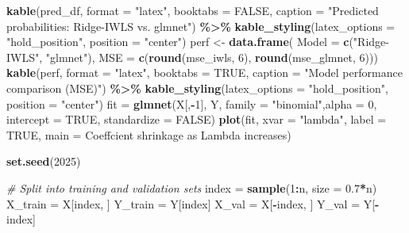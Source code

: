 \documentclass[12pt,halfline,a4paper,]{ouparticle}
\newenvironment{Shaded}{\begin{snugshade}}{\end{snugshade}}
\newcommand{\AttributeTok}[1]{\textcolor[rgb]{0.13,0.29,0.53}{#1}}
\newcommand{\CommentTok}[1]{\textcolor[rgb]{0.56,0.35,0.01}{\textit{#1}}}
\newcommand{\ConstantTok}[1]{\textcolor[rgb]{0.56,0.35,0.01}{#1}}
\newcommand{\DecValTok}[1]{\textcolor[rgb]{0.00,0.00,0.81}{#1}}
\newcommand{\FloatTok}[1]{\textcolor[rgb]{0.00,0.00,0.81}{#1}}
\newcommand{\FunctionTok}[1]{\textcolor[rgb]{0.13,0.29,0.53}{\textbf{#1}}}
\newcommand{\NormalTok}[1]{#1}
\newcommand{\OtherTok}[1]{\textcolor[rgb]{0.56,0.35,0.01}{#1}}
\newcommand{\SpecialCharTok}[1]{\textcolor[rgb]{0.81,0.36,0.00}{\textbf{#1}}}
\newcommand{\StringTok}[1]{\textcolor[rgb]{0.31,0.60,0.02}{#1}}
\begin{document}
\begin{Shaded}
\begin{Highlighting}[]
\FunctionTok{kable}\NormalTok{(pred\_df, }\AttributeTok{format =} \StringTok{"latex"}\NormalTok{, }\AttributeTok{booktabs =} \ConstantTok{FALSE}\NormalTok{, }\AttributeTok{caption =} \StringTok{"Predicted probabilities: Ridge{-}IWLS vs. glmnet"}\NormalTok{) }\SpecialCharTok{\%\textgreater{}\%}
  \FunctionTok{kable\_styling}\NormalTok{(}\AttributeTok{latex\_options =} \StringTok{"hold\_position"}\NormalTok{, }\AttributeTok{position =} \StringTok{"center"}\NormalTok{)}
\NormalTok{perf }\OtherTok{\textless{}{-}} \FunctionTok{data.frame}\NormalTok{(}
  \AttributeTok{Model =} \FunctionTok{c}\NormalTok{(}\StringTok{"Ridge{-}IWLS"}\NormalTok{, }\StringTok{"glmnet"}\NormalTok{),}
  \AttributeTok{MSE =} \FunctionTok{c}\NormalTok{(}\FunctionTok{round}\NormalTok{(mse\_iwls, }\DecValTok{6}\NormalTok{), }\FunctionTok{round}\NormalTok{(mse\_glmnet, }\DecValTok{6}\NormalTok{)))}
  \FunctionTok{kable}\NormalTok{(perf, }\AttributeTok{format =} \StringTok{"latex"}\NormalTok{, }\AttributeTok{booktabs =} \ConstantTok{TRUE}\NormalTok{, }\AttributeTok{caption =} \StringTok{"Model performance comparison (MSE)"}\NormalTok{) }\SpecialCharTok{\%\textgreater{}\%}
  \FunctionTok{kable\_styling}\NormalTok{(}\AttributeTok{latex\_options =} \StringTok{"hold\_position"}\NormalTok{, }\AttributeTok{position =} \StringTok{"center"}\NormalTok{)}
\NormalTok{fit }\OtherTok{=} \FunctionTok{glmnet}\NormalTok{(X[,}\SpecialCharTok{{-}}\DecValTok{1}\NormalTok{], Y, }\AttributeTok{family =} \StringTok{"binomial"}\NormalTok{,}\AttributeTok{alpha =} \DecValTok{0}\NormalTok{, }\AttributeTok{intercept =} \ConstantTok{TRUE}\NormalTok{, }\AttributeTok{standardize =} \ConstantTok{FALSE}\NormalTok{)}
\FunctionTok{plot}\NormalTok{(fit, }\AttributeTok{xvar =} \StringTok{"lambda"}\NormalTok{, }\AttributeTok{label =} \ConstantTok{TRUE}\NormalTok{, }\AttributeTok{main =} \StringTok{\textquotesingle{}Coeffcient shrinkage as Lambda increases\textquotesingle{}}\NormalTok{)}

\FunctionTok{set.seed}\NormalTok{(}\DecValTok{2025}\NormalTok{)}

\CommentTok{\# Split into training and validation sets}
\NormalTok{index }\OtherTok{=} \FunctionTok{sample}\NormalTok{(}\DecValTok{1}\SpecialCharTok{:}\NormalTok{n, }\AttributeTok{size =} \FloatTok{0.7}\SpecialCharTok{*}\NormalTok{n)}
\NormalTok{X\_train }\OtherTok{=}\NormalTok{ X[index, ]}
\NormalTok{Y\_train }\OtherTok{=}\NormalTok{ Y[index]}
\NormalTok{X\_val }\OtherTok{=}\NormalTok{ X[}\SpecialCharTok{{-}}\NormalTok{index, ]}
\NormalTok{Y\_val }\OtherTok{=}\NormalTok{ Y[}\SpecialCharTok{{-}}\NormalTok{index]}


\end{Highlighting}
\end{Shaded}
\end{document}
